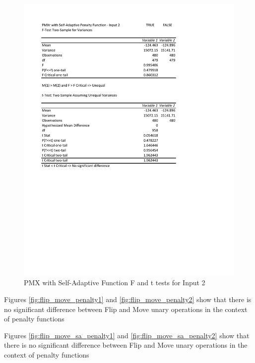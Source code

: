 \documentclass[times]{article}
\begin{document}
	\begin{figure}
		\caption{PMX with Self-Adaptive Function F and t tests for Input 2}
		\label{fig:pmx_sa_penalty2}
		\includegraphics[width=\textwidth]{./t_test/pmx_sa_penalty2}
	\end{figure}

	Figures \ref{fig:flip_move_penalty1} and \ref{fig:flip_move_penalty2} show that there is no significant difference between Flip and Move unary operations in the context of penalty functions

	Figures \ref{fig:flip_move_sa_penalty1} and \ref{fig:flip_move_sa_penalty2} show that there is no significant difference between Flip and Move unary operations in the context of penalty functions
\end{document}
